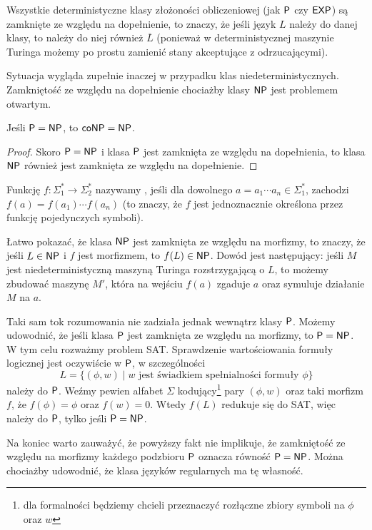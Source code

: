 \begin{remark}\label{r:classes closed under complement}
    Wszystkie deterministyczne klasy złożoności obliczeniowej (jak $\textsf{P}$ czy $\textsf{EXP}$) są zamknięte ze względu na dopełnienie, to znaczy, że jeśli język $L$ należy do danej klasy, to należy do niej również $\overline{L}$ (ponieważ w deterministycznej maszynie Turinga możemy po prostu zamienić stany akceptujące z odrzucającymi).

    Sytuacja wygląda zupełnie inaczej w przypadku klas niedeterministycznych. Zamkniętość ze względu na dopełnienie chociażby klasy $\textsf{NP}$ jest problemem otwartym.
\end{remark}

\begin{theorem}
    Jeśli $\textsf{P} = \textsf{NP}$, to $\textsf{coNP} = \textsf{NP}$.
\end{theorem}
\begin{proof}
    Skoro $\textsf{P} = \textsf{NP}$ i klasa $\textsf{P}$ jest zamknięta ze względu na dopełnienia, to klasa $\textsf{NP}$ również jest zamknięta ze względu na dopełnienie.
\end{proof}

\begin{remark}
    Funkcję $f : \Sigma_1^* \to \Sigma_2^*$ nazywamy , jeśli dla dowolnego $a = a_1 \cdots a_n \in \Sigma_1^*$, zachodzi $f(a) = f(a_1) \cdots f(a_n)$ (to znaczy, że $f$ jest jednoznacznie określona przez funkcję pojedynczych symboli).

    Łatwo pokazać, że klasa $\textsf{NP}$ jest zamknięta ze względu na morfizmy, to znaczy, że jeśli $L \in \textsf{NP}$ i $f$ jest morfizmem, to $f(L) \in \textsf{NP}$. Dowód jest następujący: jeśli $M$ jest niedeterministyczną maszyną Turinga rozstrzygającą o $L$, to możemy zbudować maszynę $M'$, która na wejściu $f(a)$ zgaduje $a$ oraz symuluje działanie $M$ na $a$.

    Taki sam tok rozumowania nie zadziała jednak wewnątrz klasy $\textsf{P}$. Możemy udowodnić, że jeśli klasa $\textsf{P}$ jest zamknięta ze względu na morfizmy, to $\textsf{P} = \textsf{NP}$.
    W tym celu rozważmy problem SAT. Sprawdzenie wartościowania formuły logicznej jest oczywiście w $\textsf{P}$, w szczególności
    \[ L = \{(\phi, w) \mid w \text{ jest świadkiem spełnialności formuły } \phi \} \]
    należy do $\textsf{P}$. Weźmy pewien alfabet $\Sigma$ kodujący\footnote{dla formalności będziemy chcieli przeznaczyć rozłączne zbiory symboli na $\phi$ oraz $w$} pary $(\phi, w)$ oraz taki morfizm $f$, że $f(\phi) = \phi$ oraz $f(w) = 0$. Wtedy $f(L)$ redukuje się do SAT, więc należy do $\textsf{P}$, tylko jeśli $\textsf{P} = \textsf{NP}$.

    Na koniec warto zauważyć, że powyższy fakt nie implikuje, że zamkniętość ze względu na morfizmy każdego podzbioru $\textsf{P}$ oznacza równość $\textsf{P} = \textsf{NP}$. Można chociażby udowodnić, że klasa języków regularnych ma tę własność.
\end{remark}


